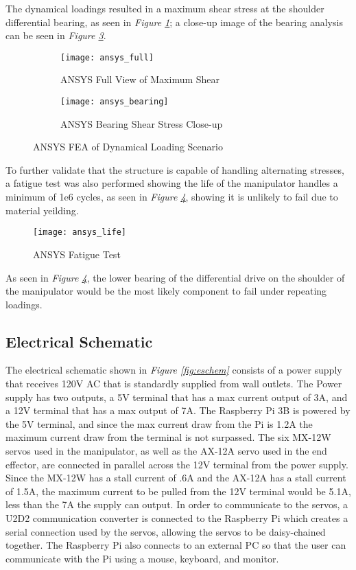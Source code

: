 The dynamical loadings resulted in a maximum shear stress at the shoulder differential bearing, as seen in \emph{Figure \ref{fig:ansys_full}}; a close-up image of the bearing analysis can be seen in \emph{Figure \ref{fig:ansys_bearing}}.

\begin{figure}[htp]
  \center
  \begin{subfigure}[t]{0.5\textwidth}
  \center
  \texttt{[image: ansys\_full]}
  \caption{ANSYS Full View of Maximum Shear}
  \label{fig:ansys_full}
\end{subfigure}%
\begin{subfigure}[t]{0.5\textwidth}
  \center
  \texttt{[image: ansys\_bearing]}
  \caption{ANSYS Bearing Shear Stress Close-up}
  \label{fig:ansys_bearing}
\end{subfigure}
  \caption{ANSYS FEA of Dynamical Loading Scenario}
\end{figure}

To further validate that the structure is capable of handling alternating stresses, a fatigue test was also performed showing the life of the manipulator handles a minimum of 1e6 cycles, as seen in \emph{Figure \ref{fig:ansys_life}}, showing it is unlikely to fail due to material yeilding.
\newpage

\begin{figure}[htp]
  \center
  \texttt{[image: ansys\_life]}
  \caption{ANSYS Fatigue Test}
  \label{fig:ansys_life}
\end{figure}

As seen in \emph{Figure \ref{fig:ansys_life}}, the lower bearing of the differential drive on the shoulder of the manipulator would be the most likely component to fail under repeating loadings.
\newpage
\subsection{Electrical Schematic}
The electrical schematic shown in \emph{Figure \ref{fig:eschem}} consists of a power supply that receives 120V AC that is standardly supplied from wall outlets. The Power supply has two outputs, a 5V terminal that has a max current output of 3A, and a 12V terminal that has a max output of 7A. The Raspberry Pi 3B is powered by the 5V terminal, and since the max current draw from the Pi is 1.2A the maximum current draw from the terminal is not surpassed. The six MX-12W servos used in the manipulator, as well as the AX-12A servo used in the end effector, are connected in parallel across the 12V terminal from the power supply. Since the MX-12W has a stall current of .6A and the AX-12A has a stall current of 1.5A, the maximum current to be pulled from the 12V terminal would be 5.1A, less than the 7A the supply can output. In order to communicate to the servos, a U2D2 communication converter is connected to the Raspberry Pi which creates a serial connection used by the servos, allowing the servos to be daisy-chained together. The Raspberry Pi also connects to an external PC so that the user can communicate with the Pi using a mouse, keyboard, and monitor.

